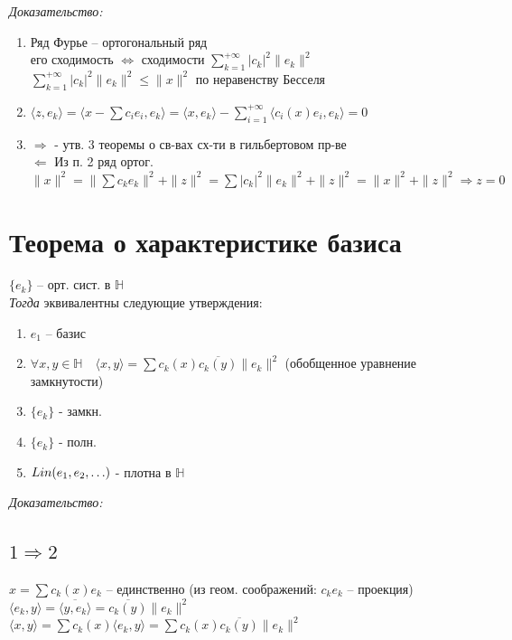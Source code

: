\documentclass[paper=a4, fontsize=17pt]{article}
\begin{document}
\emph{Доказательство:}
\begin{enumerate}
	\item
	Ряд Фурье -- ортогональный ряд\\
	его сходимость $\Leftrightarrow$ сходимости $\sum\limits_{k=1}^{+\infty} \vert c_k \vert^2 \|e_k\|^2$\\
	$\sum\limits_{k=1}^{+\infty} \vert c_k \vert^2 \|e_k\|^2 \le \|x\|^2$ по неравенству Бесселя
	\item
	$\langle z, e_k \rangle = \langle x - \sum c_i e_i, e_k \rangle = \langle x, e_k \rangle - \sum\limits_{i = 1}^{+\infty}  \langle c_i(x) e_i ,e_k \rangle = 0$
	\item
	$\Rightarrow$ - утв. 3 теоремы о св-вах сх-ти в гильбертовом пр-ве\\
	$\Leftarrow$
		Из п. 2 ряд ортог.\\
		$\|x\|^2=\|\sum c_k e_k\|^2 + \|z\|^2 = \sum \vert c_k \vert^2 \|e_k\|^2 + \|z\|^2 = \|x\|^2 + \|z\|^2 \Rightarrow z = 0$
\end{enumerate}

\section{Теорема о характеристике базиса}

$\{e_k\}$ -- орт. сист. в $\mathds{H}$\\

\emph{Тогда} эквивалентны следующие утверждения:
\begin{enumerate}
	\item $e_1$ -- базис
	\item $\forall x, y \in \mathds{H} \quad \langle x, y \rangle = \sum c_k(x)\overline{c_k(y)}\|e_k\|^2$ (обобщенное уравнение замкнутости)
	\item $\{e_k\}$ - замкн.
	\item $\{e_k\}$ - полн.
	\item $Lin(e_1, e_2, \mathellipsis)$ - плотна в $\mathds{H}$
\end{enumerate}

\emph{Доказательство:}

\subsection{\texorpdfstring{$1 \Rightarrow 2$}{TEXT}}
$x=\sum c_k(x) e_k$ -- единственно (из геом. соображений: $c_k e_k$ -- проекция)\\
$\langle e_k, y \rangle = \overline{\langle y, e_k \rangle} = \overline{c_k(y)}\|e_k\|^2$\\
$\langle x, y \rangle = \sum c_k(x) \langle e_k, y \rangle = \sum c_k(x)\overline{c_k(y)}\|e_k\|^2$
\end{document}
